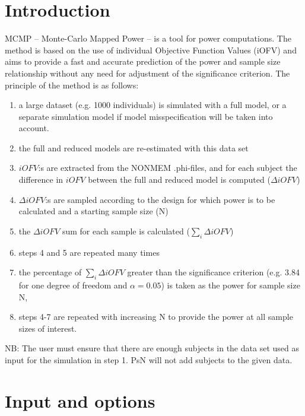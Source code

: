 




\maketitle
\newcommand{\guidetoolname}{mcmp}


\section{Introduction}
MCMP – Monte-Carlo Mapped Power \cite{Vong}  – is a tool for power computations.
The method is based on the use of individual Objective Function Values (iOFV) 
and aims to provide a fast and accurate prediction of the power and sample size 
relationship without any need for adjustment of the significance criterion.
The principle of the method is as follows:
\begin{enumerate}
\item a large dataset (e.g. 1000 individuals) is simulated with a full model, or a separate simulation model if model misspecification will be taken into account.
\item the full and reduced models are re-estimated with this data set
\item $iOFV$:s are extracted from the NONMEM .phi-files, and for each subject the difference in $iOFV$ between the full and reduced model is computed ($\Delta iOFV$)
\item $\Delta iOFV$:s are sampled according to the design for which power is to be calculated and a starting sample size (N)
\item the $\Delta iOFV$ sum for each sample is calculated ($\sum_i{\Delta iOFV}$) 
\item steps 4 and 5 are repeated many times 
\item the percentage of $\sum_i{\Delta iOFV}$ greater than the significance criterion (e.g. 3.84 for one degree of freedom and $\alpha=0.05$) 
is taken as the power for sample size N, 
\item steps 4-7 are repeated with increasing N to provide the power at all sample sizes of interest.
\end{enumerate}

\noindent NB: The user must ensure that there are enough subjects in the data set used as input for the simulation in step 1. PsN will not
add subjects to the given data.


\section{Input and options}


